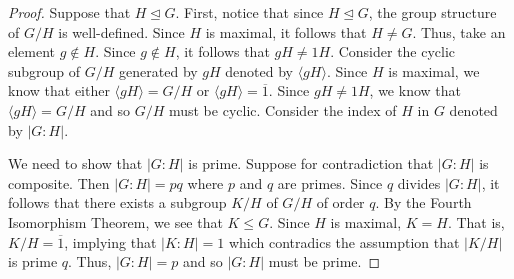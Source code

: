\documentclass[a4paper]{article}
\begin{document}
\begin{problem}
\begin{enumerate}
\begin{proof}
            Suppose that \( H \trianglelefteq G  \). First, notice that since \( H \trianglelefteq G  \), the group structure of \( G / H  \) is well-defined. Since \( H  \) is maximal, it follows that \( H \neq G  \). Thus, take an element \( g \notin H  \). Since \( g \notin H  \), it follows that \( g H \neq 1 H  \). Consider the cyclic subgroup of \( G / H  \) generated by \( gH  \) denoted by \( \langle gH \rangle \). Since \( H \) is maximal, we know that either \( \langle g H \rangle = G / H   \) or  \( \langle gH  \rangle = \overline{1}  \). Since \( gH \neq 1H  \), we know that \( \langle gH  \rangle = G / H  \) and so \( G / H  \) must be cyclic. Consider the index of \( H  \) in \( G  \) denoted by \( | G : H  |  \). 

            We need to show that \( | G : H |  \) is prime. Suppose for contradiction that \( | G : H  |   \) is composite. Then \( | G : H  | = p q     \) where \( p  \) and \( q  \) are primes. Since \( q  \) divides \( | G : H  |  \), it follows that there exists a subgroup \( K  / H  \) of \( G / H \) of order \( q  \). By the Fourth Isomorphism Theorem, we see that \( K \leq G  \). Since \( H  \) is maximal, \( K = H   \). That is, \( K / H =  \overline{1}  \), implying that \( | K : H  |  = 1  \) which contradics the assumption that \( | K / H  |   \) is prime \( q  \). Thus, \( | G : H  |  = p   \) and so \( | G : H  |  \) must be prime.         
            \end{proof}
    \end{enumerate}
\end{problem}
\end{document}
